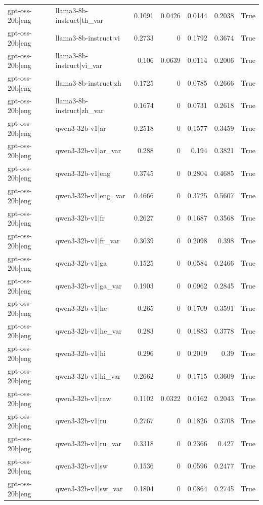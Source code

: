 \begin{table}
\begin{tabular}{l l r r r r l}
gpt-oss-20b|eng & llama3-8b-instruct|th_var & 0.1091 & 0.0426 & 0.0144 & 0.2038 & True \\
gpt-oss-20b|eng & llama3-8b-instruct|vi & 0.2733 & 0 & 0.1792 & 0.3674 & True \\
gpt-oss-20b|eng & llama3-8b-instruct|vi_var & 0.106 & 0.0639 & 0.0114 & 0.2006 & True \\
gpt-oss-20b|eng & llama3-8b-instruct|zh & 0.1725 & 0 & 0.0785 & 0.2666 & True \\
gpt-oss-20b|eng & llama3-8b-instruct|zh_var & 0.1674 & 0 & 0.0731 & 0.2618 & True \\
gpt-oss-20b|eng & qwen3-32b-v1|ar & 0.2518 & 0 & 0.1577 & 0.3459 & True \\
gpt-oss-20b|eng & qwen3-32b-v1|ar_var & 0.288 & 0 & 0.194 & 0.3821 & True \\
gpt-oss-20b|eng & qwen3-32b-v1|eng & 0.3745 & 0 & 0.2804 & 0.4685 & True \\
gpt-oss-20b|eng & qwen3-32b-v1|eng_var & 0.4666 & 0 & 0.3725 & 0.5607 & True \\
gpt-oss-20b|eng & qwen3-32b-v1|fr & 0.2627 & 0 & 0.1687 & 0.3568 & True \\
gpt-oss-20b|eng & qwen3-32b-v1|fr_var & 0.3039 & 0 & 0.2098 & 0.398 & True \\
gpt-oss-20b|eng & qwen3-32b-v1|ga & 0.1525 & 0 & 0.0584 & 0.2466 & True \\
gpt-oss-20b|eng & qwen3-32b-v1|ga_var & 0.1903 & 0 & 0.0962 & 0.2845 & True \\
gpt-oss-20b|eng & qwen3-32b-v1|he & 0.265 & 0 & 0.1709 & 0.3591 & True \\
gpt-oss-20b|eng & qwen3-32b-v1|he_var & 0.283 & 0 & 0.1883 & 0.3778 & True \\
gpt-oss-20b|eng & qwen3-32b-v1|hi & 0.296 & 0 & 0.2019 & 0.39 & True \\
gpt-oss-20b|eng & qwen3-32b-v1|hi_var & 0.2662 & 0 & 0.1715 & 0.3609 & True \\
gpt-oss-20b|eng & qwen3-32b-v1|raw & 0.1102 & 0.0322 & 0.0162 & 0.2043 & True \\
gpt-oss-20b|eng & qwen3-32b-v1|ru & 0.2767 & 0 & 0.1826 & 0.3708 & True \\
gpt-oss-20b|eng & qwen3-32b-v1|ru_var & 0.3318 & 0 & 0.2366 & 0.427 & True \\
gpt-oss-20b|eng & qwen3-32b-v1|sw & 0.1536 & 0 & 0.0596 & 0.2477 & True \\
gpt-oss-20b|eng & qwen3-32b-v1|sw_var & 0.1804 & 0 & 0.0864 & 0.2745 & True \\

\end{tabular}
\end{table}
